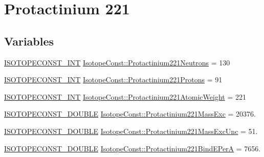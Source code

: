 \hypertarget{group___isotope_const-_protactinium-_pa221}{}\section{Protactinium 221}
\label{group___isotope_const-_protactinium-_pa221}
\subsection*{Variables}
\begin{DoxyCompactItemize}
\item 
\mbox{\hyperlink{group___isotope_const-_macros_ga5f18360b3e99483a35c32d789e62621c}{I\+S\+O\+T\+O\+P\+E\+C\+O\+N\+S\+T\+\_\+\+I\+NT}} \mbox{\hyperlink{group___isotope_const-_protactinium-_pa221_ga6b292499c95e302638b4954e08ee1c98}{Isotope\+Const\+::\+Protactinium221\+Neutrons}} = 130
\item 
\mbox{\hyperlink{group___isotope_const-_macros_ga5f18360b3e99483a35c32d789e62621c}{I\+S\+O\+T\+O\+P\+E\+C\+O\+N\+S\+T\+\_\+\+I\+NT}} \mbox{\hyperlink{group___isotope_const-_protactinium-_pa221_ga4ec0e9b0753c9d9514614747df0f420e}{Isotope\+Const\+::\+Protactinium221\+Protons}} = 91
\item 
\mbox{\hyperlink{group___isotope_const-_macros_ga5f18360b3e99483a35c32d789e62621c}{I\+S\+O\+T\+O\+P\+E\+C\+O\+N\+S\+T\+\_\+\+I\+NT}} \mbox{\hyperlink{group___isotope_const-_protactinium-_pa221_ga21ec0757d3b9275a327fa85653eb7d97}{Isotope\+Const\+::\+Protactinium221\+Atomic\+Weight}} = 221
\item 
\mbox{\hyperlink{group___isotope_const-_macros_ga8f45a7272ce02c0b4c65c44636ed719a}{I\+S\+O\+T\+O\+P\+E\+C\+O\+N\+S\+T\+\_\+\+D\+O\+U\+B\+LE}} \mbox{\hyperlink{group___isotope_const-_protactinium-_pa221_ga8fd989d6bf4ee632f4800732593cb581}{Isotope\+Const\+::\+Protactinium221\+Mass\+Exc}} = 20376.
\item 
\mbox{\hyperlink{group___isotope_const-_macros_ga8f45a7272ce02c0b4c65c44636ed719a}{I\+S\+O\+T\+O\+P\+E\+C\+O\+N\+S\+T\+\_\+\+D\+O\+U\+B\+LE}} \mbox{\hyperlink{group___isotope_const-_protactinium-_pa221_ga81be06ac8afa017b2fcdc3d70db25004}{Isotope\+Const\+::\+Protactinium221\+Mass\+Exc\+Unc}} = 51.
\item 
\mbox{\hyperlink{group___isotope_const-_macros_ga8f45a7272ce02c0b4c65c44636ed719a}{I\+S\+O\+T\+O\+P\+E\+C\+O\+N\+S\+T\+\_\+\+D\+O\+U\+B\+LE}} \mbox{\hyperlink{group___isotope_const-_protactinium-_pa221_gab26eaabc533766d7bcedafc75c770cc2}{Isotope\+Const\+::\+Protactinium221\+Bind\+E\+PerA}} = 7656.

\end{DoxyCompactItemize}
